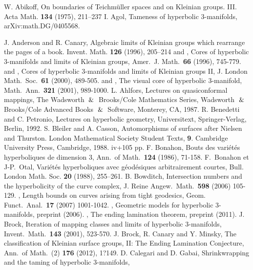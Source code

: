 \documentclass{amsart}
\theoremstyle{definition}
\numberwithin{figure}{section}
\numberwithin{equation}{section}
\begin{document}
\begin{thebibliography}{99}
 W. Abikoff, On boundaries of Teichm\"{u}ller spaces and on Kleinian groups. III. Acta Math. {\bf 134} (1975), 211--237
 I. Agol, Tameness of hyperbolic $3$-manifolds,  arXiv:math.DG/0405568.

J. Anderson and R. Canary, Algebraic limits of Kleinian groups which rearrange the pages of a book. Invent. Math. {\bf 126} (1996), 205--214
\bysame and \bysame, Cores of hyperbolic $3$-manifolds and limits of Kleinian groups, Amer.\ J. Math.\ {\bf 66} (1996), 745-779.
 \bysame and \bysame, Cores of hyperbolic $3$-manifolds and limits of Kleinian groups II, J. London Math.\ Soc.\ {\bf 61} (2000), 489-505.
 \bysame and \bysame, The visual core of hyperbolic $3$-manifold, Math.\ Ann.\ {\bf 321} (2001), 989-1000.
 L. Ahlfors, Lectures on quasiconformal mappings, The Wadsworth $\And$ Brooks/Cole Mathematics Series, Wadsworth $\And$ Brooks/Cole Advanced Books $\And$ Software, Monterey, CA, 1987. 
 R. Benedetti and C. Petronio, Lectures on hyperbolic geometry, Universitext, Springer-Verlag, Berlin, 
1992.
S. Bleiler and A. Casson,  Automorphisms of surfaces after Nielsen and Thurston. London Mathematical Society Student Texts, {\bf 9}. Cambridge University Press, Cambridge, 1988. iv+105 pp.
 F. Bonahon, Bouts des vari\'{e}t\'{e}s hyperboliques de dimension $3$, Ann.\ of Math.\ {\bf 124} (1986), 71-158.
 F.\ Bonahon et J-P.\ Otal, Vari\'{e}t\'{e}s hyperboliques avec g\'{e}od\'{e}siques arbitrairement courtes, Bull. London Math. Soc. {\bf 20} (1988),  255--261.
 B. Bowditch, Intersection numbers and the hyperbolicity of the curve complex, J. Reine 
Angew.\ Math.\ {\bf 598} (2006) 105-129.
 \bysame, Length bounds on curves arising from tight geodesics, Geom. Funct.\ Anal.\ {\bf 17} (2007) 1001-1042.
 \bysame, Geometric models for hyperbolic 3-manifolds, preprint (2006).
 \bysame, The ending lamination theorem, preprint (2011).
 J. Brock, Iteration of mapping classes and limits of hyperbolic $3$-manifolds, Invent.\ Math.\ 
{\bf 143} (2001), 523-570.
 J. Brock, R. Canary and Y. Minsky, The classification of Kleinian surface groups, II: The Ending Lamination Conjecture,  Ann.\ of Math.\ (2) {\bf 176} (2012),  1?149.
\bibitem[CG]{cg} D. Calegari and D. Gabai, Shrinkwrapping and the taming of hyperbolic $3$-manifolds, 

\end{thebibliography}
\end{document}
